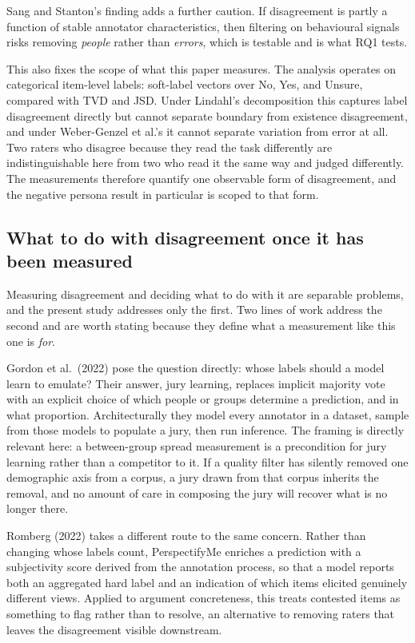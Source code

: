 \documentclass[11pt,a4paper]{article}
\begin{document}
Sang and Stanton's finding adds a further caution. If disagreement is partly a function of stable
annotator characteristics, then filtering on behavioural signals risks removing \emph{people}
rather than \emph{errors}, which is testable and is what RQ1 tests.

This also fixes the scope of what this paper measures. The analysis operates on categorical
item-level labels: soft-label vectors over No, Yes, and Unsure, compared with TVD and JSD.
Under Lindahl's decomposition this captures label disagreement directly but cannot separate
boundary from existence disagreement, and under Weber-Genzel et al.'s it cannot separate
variation from error at all. Two raters who disagree because they read the task differently are
indistinguishable here from two who read it the same way and judged differently. The measurements
therefore quantify one observable form of disagreement, and the negative persona result in
particular is scoped to that form.

\subsection{What to do with disagreement once it has been measured}
\label{sec:whattodo}

Measuring disagreement and deciding what to do with it are separable problems, and the present
study addresses only the first. Two lines of work address the second and are worth stating
because they define what a measurement like this one is \emph{for}.

Gordon et al.\ (2022) pose the question directly: whose labels should a model learn to emulate?
Their answer, jury learning, replaces implicit majority vote with an explicit choice of which
people or groups determine a prediction, and in what proportion. Architecturally they model every
annotator in a dataset, sample from those models to populate a jury, then run inference. The
framing is directly relevant here: a between-group spread measurement is a precondition for jury
learning rather than a competitor to it. If a quality filter has silently removed one demographic
axis from a corpus, a jury drawn from that corpus inherits the removal, and no amount of care in
composing the jury will recover what is no longer there.

Romberg (2022) takes a different route to the same concern. Rather than changing whose labels
count, PerspectifyMe enriches a prediction with a subjectivity score derived from the annotation
process, so that a model reports both an aggregated hard label and an indication of which items
elicited genuinely different views. Applied to argument concreteness, this treats contested items
as something to flag rather than to resolve, an alternative to removing raters that leaves the
disagreement visible downstream.
\end{document}
